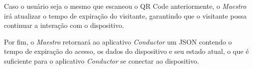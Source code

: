 Caso o usuário seja o mesmo que escaneou o QR Code anteriormente, o \emph{Maestro} irá atualizar o tempo de expiração do visitante, garantindo
que o visitante possa continuar a interação com o dispositivo.

Por fim, o \emph{Maestro} retornará ao aplicativo \emph{Conductor} um JSON contendo o tempo de expiração do acesso, os dados do dispositivo e seu 
estado atual, o que é suficiente para o aplicativo \emph{Conductor} se conectar ao dispositivo.

